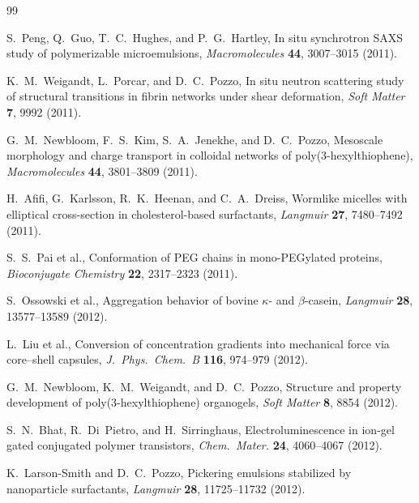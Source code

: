 \documentclass[11pt, a4paper, twocolumn]{article}
\begin{document}
{\newpage

\begin{thebibliography}{99}

S.~Peng, Q.~Guo, T.~C.~Hughes, and P.~G.~Hartley,
\newblock In situ synchrotron SAXS study of polymerizable microemulsions,
\newblock \emph{Macromolecules} \textbf{44}, 3007--3015 (2011).

K.~M.~Weigandt, L.~Porcar, and D.~C.~Pozzo,
\newblock In situ neutron scattering study of structural transitions in fibrin
networks under shear deformation,
\newblock \emph{Soft Matter} \textbf{7}, 9992 (2011).

G.~M.~Newbloom, F.~S.~Kim, S.~A.~Jenekhe, and D.~C.~Pozzo,
\newblock Mesoscale morphology and charge transport in colloidal networks of
poly(3-hexylthiophene),
\newblock \emph{Macromolecules} \textbf{44}, 3801--3809 (2011).

H.~Afifi, G.~Karlsson, R.~K.~Heenan, and C.~A.~Dreiss,
\newblock Wormlike micelles with elliptical cross-section in cholesterol-based
surfactants,
\newblock \emph{Langmuir} \textbf{27}, 7480--7492 (2011).

S.~S.~Pai et al.,
\newblock Conformation of PEG chains in mono-PEGylated proteins,
\newblock \emph{Bioconjugate Chemistry} \textbf{22}, 2317--2323 (2011).

S.~Ossowski et al.,
\newblock Aggregation behavior of bovine $\kappa$- and $\beta$-casein,
\newblock \emph{Langmuir} \textbf{28}, 13577--13589 (2012).

L.~Liu et al.,
\newblock Conversion of concentration gradients into mechanical force via
core--shell capsules,
\newblock \emph{J.\ Phys.\ Chem.\ B} \textbf{116}, 974--979 (2012).

G.~M.~Newbloom, K.~M.~Weigandt, and D.~C.~Pozzo,
\newblock Structure and property development of poly(3-hexylthiophene) organogels,
\newblock \emph{Soft Matter} \textbf{8}, 8854 (2012).

S.~N.~Bhat, R.~Di~Pietro, and H.~Sirringhaus,
\newblock Electroluminescence in ion-gel gated conjugated polymer transistors,
\newblock \emph{Chem.\ Mater.} \textbf{24}, 4060--4067 (2012).

K.~Larson-Smith and D.~C.~Pozzo,
\newblock Pickering emulsions stabilized by nanoparticle surfactants,
\newblock \emph{Langmuir} \textbf{28}, 11725--11732 (2012).


\end{thebibliography}}
\end{document}

